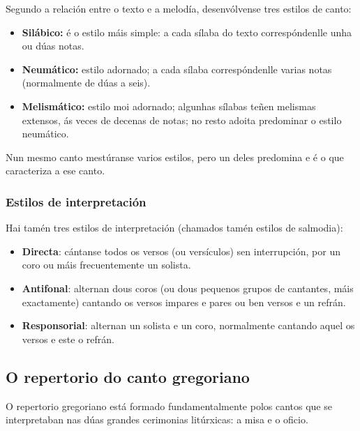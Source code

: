 \documentclass[a4paper, twoside]{templates/ociamthesis}
\providecommand{\tightlist}{%
  \setlength{\itemsep}{0pt}\setlength{\parskip}{0pt}}
\begin{document}
Segundo a relación entre o texto e a melodía, desenvólvense tres estilos de canto:

\begin{itemize}
\tightlist
\item
  \textbf{Silábico:} é o estilo máis simple: a cada sílaba do texto correspóndenlle unha ou dúas notas.
\item
  \textbf{Neumático:} estilo adornado; a cada sílaba correspóndenlle varias notas (normalmente de dúas a seis).
\item
  \textbf{Melismático:} estilo moi adornado; algunhas sílabas teñen melismas extensos, ás veces de decenas de notas; no resto adoita predominar o estilo neumático.
\end{itemize}

Nun mesmo canto mestúranse varios estilos, pero un deles predomina e é o que caracteriza a ese canto.

\hypertarget{estilos-de-interpretaciuxf3n}{%
\subsubsection{Estilos de interpretación}\label{estilos-de-interpretaciuxf3n}}

Hai tamén tres estilos de interpretación (chamados tamén estilos de salmodia):

\begin{itemize}
\tightlist
\item
  \textbf{Directa}: cántanse todos os versos (ou versículos) sen interrupción, por un coro ou máis frecuentemente un solista.
\item
  \textbf{Antifonal}: alternan dous coros (ou dous pequenos grupos de cantantes, máis exactamente) cantando os versos impares e pares ou ben versos e un refrán.
\item
  \textbf{Responsorial}: alternan un solista e un coro, normalmente cantando aquel os versos e este o refrán.
\end{itemize}

\hypertarget{o-repertorio-do-canto-gregoriano}{%
\subsection{O repertorio do canto gregoriano}\label{o-repertorio-do-canto-gregoriano}}

O repertorio gregoriano está formado fundamentalmente polos cantos que se interpretaban nas dúas grandes cerimonias litúrxicas: a misa e o oficio.
\end{document}
